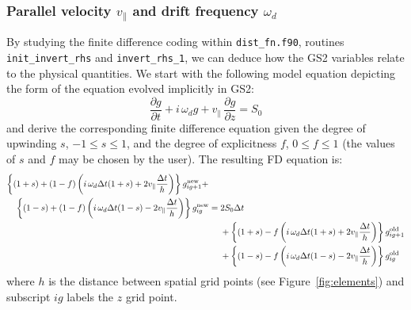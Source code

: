 \documentclass[10pt,a4paper]{article}
\newcommand{\dd}{\partial}
\begin{document}
\subsubsection*{Parallel velocity $v_\parallel$ and drift frequency $\omega_d$}

By studying the finite difference coding within \texttt{dist\_fn.f90}, routines
\texttt{init\_invert\_rhs} and \texttt{invert\_rhs\_1}, we can deduce how the
GS2 variables relate to the physical quantities. We start with the following
model equation depicting the form of the equation evolved implicitly in GS2:
\begin{equation}
\frac{\dd g}{\dd t} + i\,\omega_d g + v_\parallel\, \frac{\dd g}{\dd z} = S_0
\label{eqn:gs2advance}
\end{equation}
and derive the corresponding finite difference equation given the degree of
upwinding $s$, $-1 \leq s \leq 1$, and the degree of explicitness $f$, $0 \leq
f \leq 1$ (the values of $s$ and $f$ may be chosen by the user). The resulting
FD equation is:%
\begin{align}
  \left\{ (1+s) + (1-f) \left( i\, \omega_d \Delta t (1+s) + 2v_\parallel \frac{\Delta
        t}{h} \right) \right\} g_{ig+1}^{\mbox{\scriptsize new}} +
  \;\;\;\;\; & \nonumber \\
  \left\{ (1-s) + (1-f) \left( i\, \omega_d \Delta t (1-s) - 2v_\parallel \frac{\Delta
        t}{h} \right) \right\} g_{ig}^{\mbox{\scriptsize new}} = {}& 2
  S_0 \Delta t \nonumber \\
  & + \left\{ (1+s) -f \left( i\,\omega_d \Delta t (1+s) + 2v_\parallel \frac{\Delta
        t}{h} \right) \right\} g_{ig+1}^{\mbox{\scriptsize
      old}} \nonumber \\
  & + \left\{ (1-s) -f \left( i\,\omega_d \Delta t (1-s) - 2v_\parallel \frac{\Delta
        t}{h} \right) \right\} g_{ig}^{\mbox{\scriptsize old}}
\label{eqn:fd1}
\end{align}
where $h$ is the distance between spatial grid points (see
Figure~\ref{fig:elements}) and subscript $ig$ labels the $z$ grid point.
\end{document}
